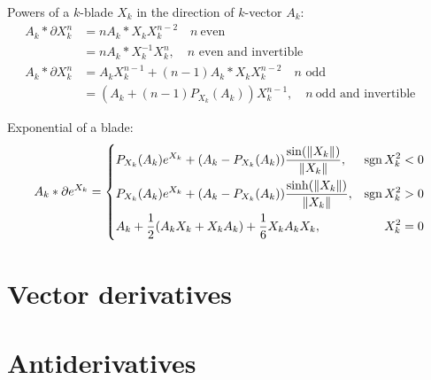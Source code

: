 \documentclass[a4paper,12pt]{article}
\begin{document}
Powers of a $k$-blade $X_k$ in the direction of $k$-vector $A_k$:
\begin{align}
\label{eq:evenbladedif}
A_k * \partial X_k^n &= n A_k *X_k X_k^{n - 2} \quad n\ \mathrm{even}&&\\
&= n A_k * X_k^{-1} X_k^{n},\quad n \textrm{ even and invertible}&&\\
A_k * \partial X_k^n &= A_k X_k^{n-1} + (n-1) A_k*X_k X_k^{n-2}
\quad n \textrm{ odd}&&\nonumber\\
\label{eq:oddbladedif}
&= \left(A_k + (n-1) P_{X_k}(A_k)\right) X_k^{n-1},\quad n\ \textrm{odd and invertible}&&
\end{align}

Exponential of a blade:
\begin{equation}
\label{eq:bladeexpdif}
A_k *\partial e^{X_k} = \left\{\begin{aligned}
&P_{X_k}(A_k) e^{X_k} + (A_k - P_{X_k}(A_k)) \frac{\sin(\left\lVert X_k\right\rVert)}{\left\lVert X_k\right\rVert}, &\operatorname{sgn}{X_k^2} < 0&\\
&P_{X_k}(A_k) e^{X_k} + (A_k - P_{X_k}(A_k)) \frac{\sinh(\left\lVert X_k\right\rVert)}{\left\lVert X_k\right\rVert}, &\operatorname{sgn}{X_k^2} > 0&\\
&A_k + \frac{1}{2}(A_k X_k + X_k A_k) + \frac{1}{6}X_k A_k X_k, &X_k^2 = 0&
\end{aligned} \right.
\end{equation}

\section{Vector derivatives}

\section{Antiderivatives}


\printbibliography[heading=bibintoc, title={References}]
\end{document}
